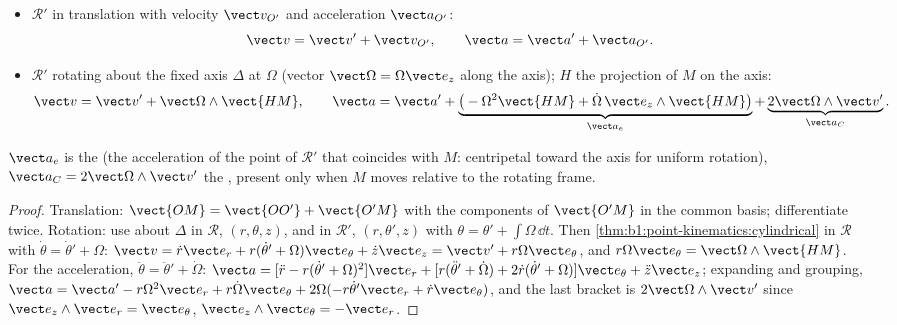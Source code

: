 \begin{theorem}\label{thm:b1:non-inertial-frames:composition}
\begin{itemize}
  \item $\mathcal R'$ in translation with velocity $\vect v_{O'}$ and
        acceleration $\vect a_{O'}$:
        \[
        \vect v = \vect v' + \vect v_{O'}, \qquad \vect a = \vect a' + \vect a_{O'} .
        \]
  \item $\mathcal R'$ rotating about the fixed axis $\Delta$ at $\Omega$ (vector
        $\vect\Omega = \Omega\vect e_z$ along the axis); $H$ the projection
        of $M$ on the axis:
        \[
        \vect v = \vect v' + \vect\Omega\wedge\vect{HM}, \qquad
        \vect a = \vect a' + \underbrace{\big(-\Omega^2\vect{HM} + \dot\Omega\,\vect e_z\wedge\vect{HM}\big)}_{\vect a_e}
        + \underbrace{2\vect\Omega\wedge\vect v'}_{\vect a_C} .
        \]
\end{itemize}
$\vect a_e$ is the \emph{} (the acceleration of the
point of $\mathcal R'$ that coincides with $M$: centripetal toward the axis
for uniform rotation), $\vect a_C = 2\vect\Omega\wedge\vect v'$ the
\emph{}, present only when $M$ moves relative to the
rotating frame.
\end{theorem}

\begin{proof}
Translation: $\vect{OM} = \vect{OO'} + \vect{O'M}$ with the components of
$\vect{O'M}$ in the common basis; differentiate twice. Rotation: use
 about $\Delta$ in $\mathcal R$, $(r, \theta, z)$, and
in $\mathcal R'$, $(r, \theta', z)$ with $\theta = \theta' + \int\Omega\,\dd t$.
Then \cref{thm:b1:point-kinematics:cylindrical} in $\mathcal R$ with
$\dot\theta = \dot\theta' + \Omega$:
$\vect v = \dot r\vect e_r + r(\dot\theta' + \Omega)\vect e_\theta + \dot z\vect e_z
= \vect v' + r\Omega\vect e_\theta$, and $r\Omega\vect e_\theta = \vect\Omega\wedge\vect{HM}$.
For the acceleration, $\ddot\theta = \ddot\theta' + \dot\Omega$:
$\vect a = [\ddot r - r(\dot\theta' + \Omega)^2]\vect e_r + [r(\ddot\theta' + \dot\Omega)
+ 2\dot r(\dot\theta' + \Omega)]\vect e_\theta + \ddot z\vect e_z$; expanding and
grouping, $\vect a = \vect a' - r\Omega^2\vect e_r + r\dot\Omega\vect e_\theta
+ 2\Omega(-r\dot\theta'\vect e_r + \dot r\vect e_\theta)$, and the last bracket is
$2\vect\Omega\wedge\vect v'$ since $\vect e_z\wedge\vect e_r = \vect e_\theta$,
$\vect e_z\wedge\vect e_\theta = -\vect e_r$.
\end{proof}

